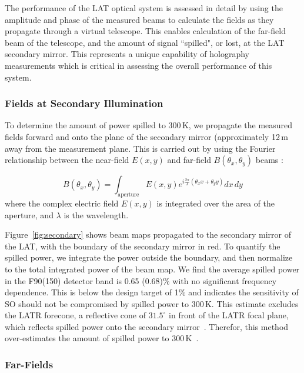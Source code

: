 The performance of the LAT optical system is assessed in detail by using the amplitude and phase of the measured beams to calculate the fields as they propagate through a virtual telescope.  This enables calculation of the far-field beam of the telescope, and the amount of signal ``spilled", or lost, at the LAT secondary mirror.  This represents a unique capability of holography measurements which is critical in assessing the overall performance of this system. 

\subsubsection{Fields at Secondary Illumination}
To determine the amount of power spilled to 300\,K, we propagate the measured fields forward and onto the plane of the secondary mirror (approximately 12\,m away from the measurement plane.  This is carried out by using the Fourier relationship between the near-field $E(x,y)$ and far-field $B(\theta_x,\theta_y)$ beams \cite{McIntosh2016,alma_holog}:

\begin{equation}
    B(\theta_x,\theta_y) = \int_{\text{aperture}} E(x,y) e^{ i \frac{2\pi}{\lambda} (\theta_x x + \theta_y y )} dx \, dy 
    \label{eq:fft}
\end{equation}
where the complex electric field $E(x,y)$ is integrated over the area of the aperture, and $\lambda$ is the wavelength.

Figure~\ref{fig:secondary} shows beam maps propagated to the secondary mirror of the LAT, with the boundary  of the secondary mirror in red.  To quantify the spilled power, we integrate the power outside the boundary, and then normalize to the total integrated power of the beam map.  We find the average spilled power in the F90(150) detector band is 0.65 (0.68)\% with no significant frequency dependence.  This is below the design target of 1\% and indicates the sensitivity of SO should not be compromised by spilled power to 300\,K.  This estimate excludes the LATR forecone, a reflective cone of $31.5^\circ$ in front of the LATR focal plane, which reflects spilled power onto the secondary mirror~\cite{2021RNAAS...5..100X}.  Therefor, this method over-estimates the amount of spilled power to 300\,K~\cite{Gudmundsson:21}.

\subsubsection{Far-Fields}

